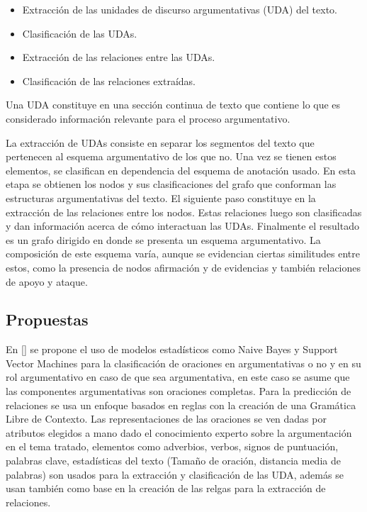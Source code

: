 \begin{itemize}
    \item Extracción de las unidades de discurso argumentativas (UDA) del texto.
    \item Clasificación de las UDAs.
    \item Extracción de las relaciones entre las UDAs.
    \item Clasificación de las relaciones extraídas.
\end{itemize}

Una UDA constituye en una sección continua de texto que contiene lo que es considerado información
relevante para el proceso argumentativo. 

La extracción de UDAs consiste en separar los segmentos del texto que pertenecen al esquema argumentativo
de los que no. Una vez se tienen estos elementos, se clasifican en dependencia del esquema de anotación
usado. En esta etapa se obtienen los nodos y sus clasificaciones del grafo que conforman las estructuras 
argumentativas del texto. El siguiente paso constituye en la extracción de las relaciones entre los nodos.
Estas relaciones luego son clasificadas y dan información acerca de cómo interactuan las UDAs. Finalmente
el resultado es un grafo dirigido en donde se presenta un esquema argumentativo. La composición de este esquema
varía, aunque se evidencian ciertas similitudes entre estos, como la presencia de nodos afirmación y de evidencias
y también relaciones de apoyo y ataque.

\subsection{Propuestas}

En [\cite{palau2009argumentation}] se propone
el uso de modelos estadísticos como Naive Bayes y Support Vector Machines para la clasificación de 
oraciones en argumentativas o no y en su rol argumentativo en caso de que sea argumentativa, en este
caso se asume que las componentes argumentativas son oraciones completas. Para la predicción de relaciones
se usa un enfoque basados en reglas con la creación de una Gramática Libre de Contexto. Las representaciones
de las oraciones se ven dadas por atributos elegidos a mano dado el conocimiento experto sobre la argumentación
en el tema tratado, elementos como adverbios, verbos, signos de puntuación, palabras clave, estadísticas del texto
(Tamaño de oración, distancia media de palabras) son usados para la extracción y clasificación de las UDA, además
se usan también como base en la creación de las relgas para la extracción de relaciones.

